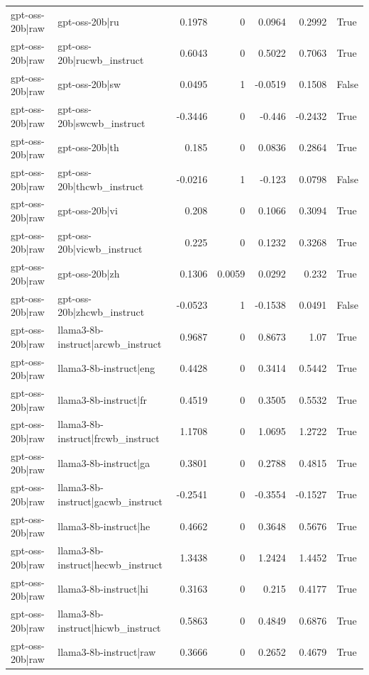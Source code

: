 \begin{table}
\begin{tabular}{l l r r r r l}
gpt-oss-20b|raw & gpt-oss-20b|ru & 0.1978 & 0 & 0.0964 & 0.2992 & True \\
gpt-oss-20b|raw & gpt-oss-20b|rucwb_instruct & 0.6043 & 0 & 0.5022 & 0.7063 & True \\
gpt-oss-20b|raw & gpt-oss-20b|sw & 0.0495 & 1 & -0.0519 & 0.1508 & False \\
gpt-oss-20b|raw & gpt-oss-20b|swcwb_instruct & -0.3446 & 0 & -0.446 & -0.2432 & True \\
gpt-oss-20b|raw & gpt-oss-20b|th & 0.185 & 0 & 0.0836 & 0.2864 & True \\
gpt-oss-20b|raw & gpt-oss-20b|thcwb_instruct & -0.0216 & 1 & -0.123 & 0.0798 & False \\
gpt-oss-20b|raw & gpt-oss-20b|vi & 0.208 & 0 & 0.1066 & 0.3094 & True \\
gpt-oss-20b|raw & gpt-oss-20b|vicwb_instruct & 0.225 & 0 & 0.1232 & 0.3268 & True \\
gpt-oss-20b|raw & gpt-oss-20b|zh & 0.1306 & 0.0059 & 0.0292 & 0.232 & True \\
gpt-oss-20b|raw & gpt-oss-20b|zhcwb_instruct & -0.0523 & 1 & -0.1538 & 0.0491 & False \\
gpt-oss-20b|raw & llama3-8b-instruct|arcwb_instruct & 0.9687 & 0 & 0.8673 & 1.07 & True \\
gpt-oss-20b|raw & llama3-8b-instruct|eng & 0.4428 & 0 & 0.3414 & 0.5442 & True \\
gpt-oss-20b|raw & llama3-8b-instruct|fr & 0.4519 & 0 & 0.3505 & 0.5532 & True \\
gpt-oss-20b|raw & llama3-8b-instruct|frcwb_instruct & 1.1708 & 0 & 1.0695 & 1.2722 & True \\
gpt-oss-20b|raw & llama3-8b-instruct|ga & 0.3801 & 0 & 0.2788 & 0.4815 & True \\
gpt-oss-20b|raw & llama3-8b-instruct|gacwb_instruct & -0.2541 & 0 & -0.3554 & -0.1527 & True \\
gpt-oss-20b|raw & llama3-8b-instruct|he & 0.4662 & 0 & 0.3648 & 0.5676 & True \\
gpt-oss-20b|raw & llama3-8b-instruct|hecwb_instruct & 1.3438 & 0 & 1.2424 & 1.4452 & True \\
gpt-oss-20b|raw & llama3-8b-instruct|hi & 0.3163 & 0 & 0.215 & 0.4177 & True \\
gpt-oss-20b|raw & llama3-8b-instruct|hicwb_instruct & 0.5863 & 0 & 0.4849 & 0.6876 & True \\
gpt-oss-20b|raw & llama3-8b-instruct|raw & 0.3666 & 0 & 0.2652 & 0.4679 & True \\

\end{tabular}
\end{table}
